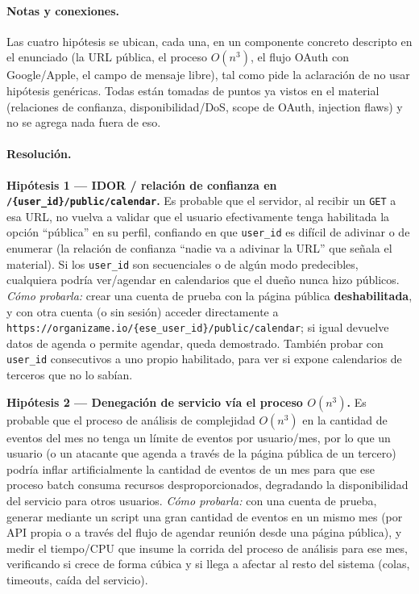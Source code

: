 \paragraph{Notas y conexiones.}
Las cuatro hipótesis se ubican, cada una, en un componente concreto descripto en el
enunciado (la URL pública, el proceso $O(n^3)$, el flujo OAuth con Google/Apple, el campo
de mensaje libre), tal como pide la aclaración de no usar hipótesis genéricas. Todas están
tomadas de puntos ya vistos en el material (relaciones de confianza, disponibilidad/DoS,
scope de OAuth, injection flaws) y no se agrega nada fuera de eso.

\paragraph{Resolución.}

\textbf{Hipótesis 1 --- IDOR / relación de confianza en \texttt{/\{user\_id\}/public/calendar}.}
Es probable que el servidor, al recibir un \texttt{GET} a esa URL, no vuelva a validar que
el usuario efectivamente tenga habilitada la opción ``pública'' en su perfil, confiando en
que \texttt{user\_id} es difícil de adivinar o de enumerar (la relación de confianza
``nadie va a adivinar la URL'' que señala el material). Si los \texttt{user\_id} son
secuenciales o de algún modo predecibles, cualquiera podría ver/agendar en calendarios que
el dueño nunca hizo públicos.
\emph{Cómo probarla:} crear una cuenta de prueba con la página pública \textbf{deshabilitada},
y con otra cuenta (o sin sesión) acceder directamente a
\texttt{https://organizame.io/\{ese\_user\_id\}/public/calendar}; si igual devuelve datos
de agenda o permite agendar, queda demostrado. También probar con \texttt{user\_id}
consecutivos a uno propio habilitado, para ver si expone calendarios de terceros que no lo
sabían.

\textbf{Hipótesis 2 --- Denegación de servicio vía el proceso $O(n^3)$.} Es probable que el
proceso de análisis de complejidad $O(n^3)$ en la cantidad de eventos del mes no tenga un
límite de eventos por usuario/mes, por lo que un usuario (o un atacante que agenda a través
de la página pública de un tercero) podría inflar artificialmente la cantidad de eventos de
un mes para que ese proceso batch consuma recursos desproporcionados, degradando la
disponibilidad del servicio para otros usuarios.
\emph{Cómo probarla:} con una cuenta de prueba, generar mediante un script una gran
cantidad de eventos en un mismo mes (por API propia o a través del flujo de agendar
reunión desde una página pública), y medir el tiempo/CPU que insume la corrida del proceso
de análisis para ese mes, verificando si crece de forma cúbica y si llega a afectar al
resto del sistema (colas, timeouts, caída del servicio).

